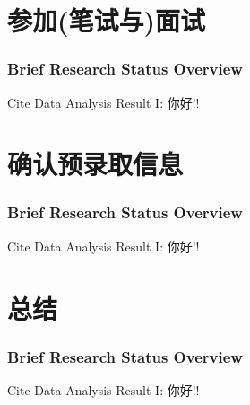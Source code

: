 \documentclass{beamer}
\begin{document}
    \section{参加(笔试与)面试}  
    
    \begin{frame}
    \frametitle{Brief Research Status Overview}
    Cite Data Analysis Result I:
    你好!!
    \end{frame}

    \section{确认预录取信息}  
    
    \begin{frame}
    \frametitle{Brief Research Status Overview}
    Cite Data Analysis Result I:
    你好!!
    \end{frame}

    \section{总结}  

    \begin{frame}
      \frametitle{Brief Research Status Overview}
      Cite Data Analysis Result I:
      你好!!
      \end{frame}
  
\end{document}
